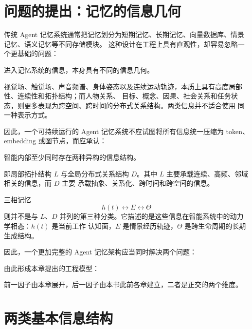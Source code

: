 \section{问题的提出：记忆的信息几何}

传统 Agent 记忆系统通常把记忆划分为短期记忆、长期记忆、向量数据库、情景记忆、语义记忆等不同存储模块。
这种设计在工程上具有直观性，却容易忽略一个更基础的问题：

\begin{statementbox}
进入记忆系统的信息，本身具有不同的信息几何。
\end{statementbox}

视觉场、触觉场、声音频谱、身体姿态以及连续运动轨迹，本质上具有高度局部性、连续性和拓扑结构；而人物关系、
目标、概念、因果、社会关系和任务状态，则更多表现为跨空间、跨时间的分布式关系结构。两类信息并不适合使用
同一种表示方式。

因此，一个可持续运行的 Agent 记忆系统不应试图将所有信息统一压缩为 token、embedding 或图节点，而应承认：

\begin{statementbox}
智能内部至少同时存在两种异构的信息结构。
\end{statementbox}

即局部拓扑结构 $L$ 与全局分布式关系结构 $D$。其中 $L$ 主要承载连续、高频、邻域相关的信息，而 $D$ 主要
承载抽象、关系化、跨时间和跨空间的信息。

三相记忆
\[
h(t)\leftrightarrow E\leftrightarrow\Theta
\]
则并不是与 $L$、$D$ 并列的第三种分类。它描述的是这些信息在智能系统中的动力学相态：$h(t)$ 是当前工作
认知面，$E$ 是情景经历轨迹，$\Theta$ 是跨生命周期的长期生成结构。

因此，一个更加完整的 Agent 记忆架构应当同时解决两个问题：

\begin{statementbox}
\centering
{}
\end{statementbox}

由此形成本章提出的工程模型：

\begin{statementbox}
\centering
{}
\end{statementbox}

前一因子由本章展开，后一因子由本书此前各章建立，二者是正交的两个维度。

\section{两类基本信息结构}

